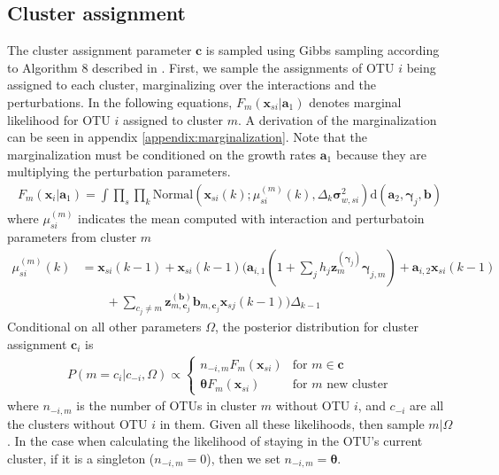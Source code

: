 \documentclass{article}
\newcommand{\Normaldist}{\text{Normal}}
\renewcommand{\c}{\mathbf{c}}
\newcommand{\concc}{\mathbf{\theta}}
\renewcommand{\a}[2]{\mathbf{a}_{#1,#2}}
\renewcommand{\aa}[1]{\mathbf{a}_{#1}}
\newcommand{\pert}{\mathbf{\gamma}_j}
\newcommand{\pertstep}{h_j}
\newcommand{\x}[2]{\mathbf{x}_{#2}(#1)}
\newcommand{\varw}[1]{\mathbf{\sigma}^2_{w,{}#1}}
\newcommand{\dt}{\Delta_{k}}
\begin{document}
\subsection{Cluster assignment}
The cluster assignment parameter $\c$ is sampled using Gibbs sampling according to Algorithm 8 described in \cite{cite:neal2000}. First, we sample the assignments of OTU $i$ being assigned to each cluster, marginalizing over the interactions and the perturbations. In the following equations, $F_m(\mathbf{x}_{si} | \aa{1})$ denotes marginal likelihood for OTU $i$ assigned to cluster $m$. A derivation of the marginalization can be seen in appendix \ref{appendix:marginalization}. Note that the marginalization must be conditioned on the growth rates $\aa{1}$ because they are multiplying the perturbation parameters.
\begin{align}
  F_m(\mathbf{x}_{i} | \aa{1}) = \int \prod_s \prod_k \Normaldist(\x{k}{si}; \mu_{si}^{(m)}(k), \dt \varw{si}) \text{d}(\aa{2}, \pert, \mathbf{b})
\end{align}
where $\mu_{si}^{(m)}$ indicates the mean computed with interaction and perturbatoin parameters from cluster $m$
\begin{align}
  \mu_{si}^{(m)}(k) & = \x{k-1}{si} +
    \x{k-1}{si} (
      \a{i}{1} (1 +
        \sum_j
        \pertstep
        \mathbf{z}^{(\mathbf{\gamma}_j)}_m
        \mathbf{\gamma}_{j,m}) +
      \a{i}{2} \x{k-1}{si} \\
    & \quad \quad + \sum_{c_j \ne m} \mathbf{z}_{m,\c_j}^{(\mathbf{b})} \mathbf{b}_{m, \c_j} \x{k-1}{sj}) \Delta_{k-1} \nonumber
\end{align}
Conditional on all other parameters $\Omega$, the posterior distribution for cluster assignment $\c_i$ is
\begin{align}
  P(m = c_i | c_{-i}, \Omega) \propto \begin{cases}
  n_{-i,m} F_m (\mathbf{x}_{si}) & \text{for } m \in \c \\
  \concc F_m (\mathbf{x}_{si}) & \text{for } m \text{ new cluster}
\end{cases}
\end{align}
where $n_{-i,m}$ is the number of OTUs in cluster $m$ without OTU $i$, and $c_{-i}$ are all the clusters without OTU $i$ in them. Given all these likelihoods, then sample $m | \Omega$. In the case when calculating the likelihood of staying in the OTU's current cluster, if it is a singleton ($n_{-i,m} = 0$), then we set $n_{-i,m} = \concc$.
\end{document}
